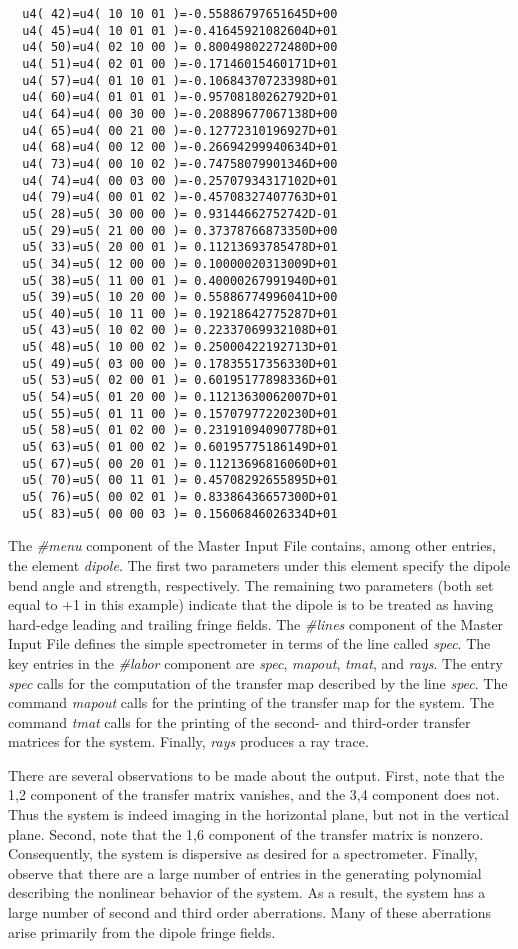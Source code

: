 {\begin{verbatim}
  u4( 42)=u4( 10 10 01 )=-0.55886797651645D+00
  u4( 45)=u4( 10 01 01 )=-0.41645921082604D+01
  u4( 50)=u4( 02 10 00 )= 0.80049802272480D+00
  u4( 51)=u4( 02 01 00 )=-0.17146015460171D+01
  u4( 57)=u4( 01 10 01 )=-0.10684370723398D+01
  u4( 60)=u4( 01 01 01 )=-0.95708180262792D+01
  u4( 64)=u4( 00 30 00 )=-0.20889677067138D+00
  u4( 65)=u4( 00 21 00 )=-0.12772310196927D+01
  u4( 68)=u4( 00 12 00 )=-0.26694299940634D+01
  u4( 73)=u4( 00 10 02 )=-0.74758079901346D+00
  u4( 74)=u4( 00 03 00 )=-0.25707934317102D+01
  u4( 79)=u4( 00 01 02 )=-0.45708327407763D+01
  u5( 28)=u5( 30 00 00 )= 0.93144662752742D-01
  u5( 29)=u5( 21 00 00 )= 0.37378766873350D+00
  u5( 33)=u5( 20 00 01 )= 0.11213693785478D+01
  u5( 34)=u5( 12 00 00 )= 0.10000020313009D+01
  u5( 38)=u5( 11 00 01 )= 0.40000267991940D+01
  u5( 39)=u5( 10 20 00 )= 0.55886774996041D+00
  u5( 40)=u5( 10 11 00 )= 0.19218642775287D+01
  u5( 43)=u5( 10 02 00 )= 0.22337069932108D+01
  u5( 48)=u5( 10 00 02 )= 0.25000422192713D+01
  u5( 49)=u5( 03 00 00 )= 0.17835517356330D+01
  u5( 53)=u5( 02 00 01 )= 0.60195177898336D+01
  u5( 54)=u5( 01 20 00 )= 0.11213630062007D+01
  u5( 55)=u5( 01 11 00 )= 0.15707977220230D+01
  u5( 58)=u5( 01 02 00 )= 0.23191094090778D+01
  u5( 63)=u5( 01 00 02 )= 0.60195775186149D+01
  u5( 67)=u5( 00 20 01 )= 0.11213696816060D+01
  u5( 70)=u5( 00 11 01 )= 0.45708292655895D+01
  u5( 76)=u5( 00 02 01 )= 0.83386436657300D+01
  u5( 83)=u5( 00 00 03 )= 0.15606846026334D+01
\end{verbatim}}


     The {\em \#menu} component of the Master Input File contains, among other
entries, the element {\em dipole}.  The first two parameters under this element
specify the dipole bend angle and strength, respectively.  The remaining
two parameters (both set equal to +1 in this example) indicate that the
dipole is to be treated as having hard-edge leading and trailing fringe
fields.  The {\em \#lines} component of the Master Input File defines the simple
spectrometer in terms of the line called {\em spec}.  The key entries in the
{\em \#labor} component are {\em spec}, {\em mapout}, {\em tmat}, and {\em rays}.  The entry {\em spec } calls
for the computation of the transfer map described by the line {\em spec}.  The
command {\em mapout } calls for the printing of the transfer map for the system.
The command {\em tmat } calls for the printing of the second- and third-order
transfer matrices for the system.  Finally, {\em rays } produces a ray trace.

     There are several observations to be made about the \Mary output.
First, note that the 1,2 component of the transfer matrix vanishes, and the
3,4 component does not.  Thus the system is indeed imaging in the
horizontal plane, but not in the vertical plane.  Second, note that the 1,6
component of the transfer matrix is nonzero.  Consequently, the system is
dispersive as desired for a spectrometer.  Finally, observe that there are
a large number of entries in the generating polynomial describing the
nonlinear behavior of the system.  As a result, the system has a large
number of second and third order aberrations.  Many of these aberrations
arise primarily from the dipole fringe fields.

